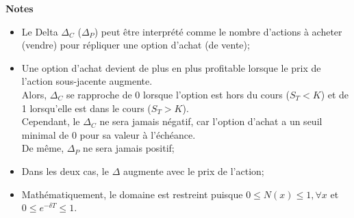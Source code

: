 \documentclass[10pt, french]{article}
\begin{document}
\begin{multicols*}{2}
\begin{definitionNOHFILL}[Delta $\Delta	=	\deriv{S_{0}}{V}$]
\begin{center}
	\textbf{Notes}
\end{center}
\begin{itemize}[leftmargin = *]
	\item	Le Delta $\Delta_{C}$ ($\Delta_{P}$) peut être interprété comme le nombre d'actions à acheter (vendre) pour répliquer une option d'achat (de vente);
	\item	Une option d'achat devient de plus en plus profitable lorsque le prix de l'action sous-jacente augmente. \\
			Alors, $\Delta_{C}$ se rapproche de 0 lorsque l'option est hors du cours ($S_{T} < K$) et de 1 lorsqu'elle est dans le cours ($S_{T} > K$).\\
			Cependant, le $\Delta_{C}$ ne sera jamais négatif, car l'option d'achat a un seuil minimal de 0 pour sa valeur à l'échéance.\\
			De même, $\Delta_{P}$ ne sera jamais positif;
	\item	Dans les deux cas, le $\Delta$ augmente avec le prix de l'action;
	\item	Mathématiquement, le domaine est restreint puisque $0 \le N(x) \le 1, \forall x$ et $0 \le e^{-\delta T} \le 1$.
\end{itemize}
\end{definitionNOHFILL}

\end{multicols*}
\end{document}
